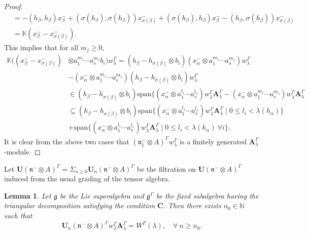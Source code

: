 \documentclass[11pt]{amsart}
\theoremstyle{plain}
\newtheorem{lemma}[thm]{Lemma}
\theoremstyle{definition}
\newcommand{\g}{\mathfrak{g}}
\newcommand{\n}{\mathfrak{n}}
\newcommand{\A}{\mathbf{A}_{\lambda}^{\Gamma}}
\newcommand{\w}{w_{\lambda}^{\Gamma}}
\begin{document}
\begin{proof}
\begin{align*}
&=-(h_{\beta}, h_{\beta})x^{-}_{\beta}+(\sigma(h_{\beta}),\sigma(h_{\beta}))x^{-}_{\sigma(\beta)}+(\sigma(h_{\beta}), h_{\beta})x^{-}_{\beta}-(h_{\beta}, \sigma(h_{\beta}))x^{-}_{\sigma(\beta)}\\
&=\mathbb{K}(x^{-}_{\beta}-x^{-}_{\sigma(\beta)}).
    \end{align*}
This implies that for all $m_{j}\geq 0$,
\begin{align*}
\mathbb{K}((x_{\beta}^{-}-x_{\sigma(\beta)}^{-})&\otimes a_{1}^{m_{1}}\cdots a_{s}^{m_{s}}b_{i})w_{\lambda}^{\Gamma}
            =(h_{\beta}-h_{\sigma(\beta)}\otimes b_{i})(x_{\alpha}^{-}\otimes a_{1}^{m_1}\cdots a_{s}^{m_s})\w\\&-(x_{\alpha}^{-}\otimes a_{1}^{m_1}\cdots a_{s}^{m_s})(h_{\beta}-h_{\sigma(\beta)}\otimes b_{i})\w \\
            &\in(h_{\beta}-h_{\sigma(\beta)}\otimes b_{i})\mbox{span}\{(x_{\alpha}^{-}\otimes a_{1}^{l_1}\cdots a_{s}^{l_s})\w\A-(x_{\alpha}^{-}\otimes a_{1}^{m_1}\cdots a_{s}^{m_s})\w\A \\
&\subseteq(h_{\beta}-h_{\sigma(\beta)}\otimes b_{i})\mbox{span}\{(x_{\alpha}^{-}\otimes a_{1}^{l_1}\cdots a_{s}^{l_s})\w\A\mid 0\leq l_{i}<\lambda(h_{\alpha})\}\\
&+\mbox{span}\{(x_{\alpha}^{-}\otimes a_{1}^{l_1}\cdots a_{s}^{l_s})\w\A\mid 0\leq l_{i}<\lambda(h_{\alpha})~\forall i\}.
\end{align*}
It is clear from the above two cases that $(\n^{-}_{\bar{1}}\otimes A)^{\Gamma}w_{\lambda}^{\Gamma}$ is a finitely generated $\A$-module. 
\end{proof}
Let $\mathbf{U}(\n^{-}\otimes A)^{\Gamma}=\Sigma_{n\geq 0}\mathbf{U}_{n}(\n^{-}\otimes A)^{\Gamma}$ be the filtration on $\mathbf{U}(\n^{-}\otimes A)^{\Gamma}$ induced from the usual grading of the tensor algebra.
 \begin{lemma}\label{lem:15}
Let $\g$ be the Lie superalgebra and $\g^{\Gamma}$ be the fixed subalgebra having the triangular decomposition satisfying the condition $\mathbf{C}$. Then there exists $n_{0}\in\mathbb{N}$ such that 
     \begin{equation*}
         \mathbf{U}_{n}(\n^{-}\otimes A)^{\Gamma}\w\A=W^{\Gamma}(\lambda), \quad \forall~n\geq n_{0}.
     \end{equation*}
 \end{lemma}
\end{document}
